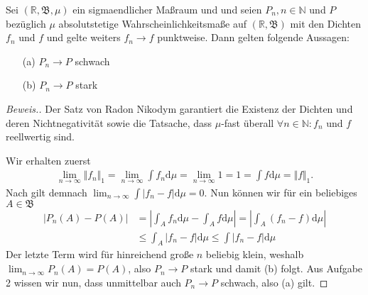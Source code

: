 \begin{lemma}
    Sei $(\mathbb{R},\mathfrak{B},\mu)$ ein sigmaendlicher Maßraum und und seien $P_n,n\in\mathbb{N}$ und $P$ bezüglich $\mu$ absolutstetige Wahrscheinlichkeitsmaße auf $(\mathbb{R},\mathfrak{B})$ mit den Dichten $f_n$ und $f$ und gelte weiters $f_n\to f$ punktweise. Dann gelten folgende Aussagen:
    \begin{itemize}
        \item[(a)] $P_n\to P$ schwach
        \item[(b)] $P_n\to P$ stark 
    \end{itemize}
\end{lemma}
\begin{proof}[Beweis.]
    Der Satz von Radon Nikodym \cite[Satz 11.19]{zbMATH06257850} garantiert die Existenz der Dichten und deren Nichtnegativität sowie die Tatsache, dass $\mu$-fast überall $\forall n\in\mathbb{N}:f_n$ und $f$ reellwertig sind.

    Wir erhalten zuerst
    \begin{align*}
        \lim_{n\to\infty}\Vert f_n\Vert_1=\lim_{n\to\infty}\int f_n\mathrm{d}\mu=\lim_{n\to\infty}1=1=\int f\mathrm{d}\mu=\Vert f\Vert_1.
    \end{align*}
    Nach \cite[Satz 13.24]{zbMATH06257850} gilt demnach $\lim_{n\to\infty}\int \vert f_n-f\vert\mathrm{d}\mu=0$. Nun können wir für ein beliebiges $A\in\mathfrak{B}$
    \begin{align*}
        \left\vert P_n(A)-P(A)\right\vert&=\left\vert \int_Af_n\mathrm{d}\mu-\int_Af\mathrm{d}\mu\right\vert=\left\vert \int_A(f_n-f)\mathrm{d}\mu\right\vert\\
        &\leq\int_A\vert f_n-f\vert\mathrm{d}\mu\leq\int\vert f_n-f\vert\mathrm{d}\mu
    \end{align*}
    Der letzte Term wird für hinreichend große $n$ beliebig klein, weshalb $\lim_{n\to\infty}P_n(A)=P(A)$, also $P_n\to P$ stark und damit (b) folgt. Aus Aufgabe 2 wissen wir nun, dass unmittelbar auch $P_n\to P$ schwach, also (a) gilt.
\end{proof}